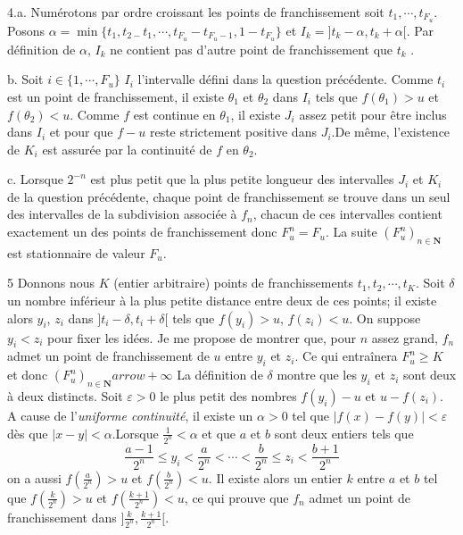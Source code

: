 4.a.  Num{\'e}rotons par ordre croissant les points de franchissement soit $%
t_{1},\cdots ,t_{F_{u}}$. Posons $\alpha =\min \{
t_{1},t_{2-}t_{1},\cdots ,t_{F_{u}}-t_{F_{u}-1},1-t_{F_{u}}\} $ et $%
I_{k}=] t_{k}-\alpha ,t_{k}+\alpha [ $. Par d{\'e}finition de $%
\alpha $, $I_{k}$ ne contient pas d'autre point de franchissement que $t_{k}$%
.

b.  Soit $i\in \{ 1,\cdots ,F_{u}\} $ $I_{i}$ l'intervalle
d{\'e}fini dans la question pr{\'e}c{\'e}dente. Comme $t_{i}$ est
un point de franchissement, il existe $\theta _{1}$ et $\theta
_{2}$ dans $I_{i}$ tels que $f(\theta _{1})>u$ et $f(\theta
_{2})<u$. Comme $f$ est continue en $\theta _{1}$, il existe
$J_{i}$ assez petit pour {\^e}tre inclus dans $I_{i} $ et pour que
$f-u$ reste strictement positive dans $J_{i}.$De m{\^e}me,
l'existence de $K_{i}$ est assur{\'e}e par la continuit{\'e} de $f$ en $%
\theta _{2}$.

c.  Lorsque $2^{-n}$ est plus petit que la plus petite longueur
des intervalles $J_{i}$ et $K_{i}$ de la question
pr{\'e}c{\'e}dente, chaque point de franchissement se trouve dans
un seul des intervalles de la subdivision associ{\'e}e {\`a}
$f_{n}$, chacun de ces intervalles contient
exactement un des points de franchissement donc $F_{u}^{n}=F_{u}$. La suite $%
(F_{u}^{n})_{n\in \mathbf{N}}$ est stationnaire de valeur $F_{u}$.

5  Donnons nous $K$ (entier arbitraire) points de franchissements $%
t_{1},t_{2},\cdots ,t_{K}$. Soit $\delta $ un nombre inf{\'e}rieur {\`a}
la
plus petite distance entre deux de ces points; il existe alors $y_{i}$, $%
z_{i}$ dans $] t_{i}-\delta ,t_{i}+\delta [ $ tels que $f(y_{i})>u
$, $f(z_{i})<u$. On suppose $y_{i}<z_{i}$ pour fixer les
id{\'e}es. Je me propose de montrer que, pour $n$ assez grand,
$f_{n}$ admet un point de
franchissement de $u$ entre $y_{i}$ et $z_{i}$. Ce qui entra\^{i}nera $%
F_{u}^{n}\geq K$ et donc $(F_{u}^{n})_{n\in \mathbf{N}}arrow +\infty $%
\newline
La d{\'e}finition de $\delta $ montre que les $y_{i}$ et $z_{i}$ sont
deux
{\`a} deux distincts. Soit $\varepsilon >0$ le plus petit des nombres $%
f(y_{i})-u$ et $u-f(z_{i})$. A cause de l'\emph{uniforme
continuit{\'e}}, il existe un $\alpha >0$ tel que $| f(x)-f(y)|
<\varepsilon $ d{\`e}s que $| x-y| <\alpha $.\newline Lorsque
$\frac{1}{2^{n}}<\alpha $ et que $a$ et $b$ sont deux entiers tels
que
\[
\frac{a-1}{2^{n}}\leq y_{i}<\frac{a}{2^{n}}<\cdots
<\frac{b}{2^{n}}\leq z_{i}<\frac{b+1}{2^{n}}
\]
on a aussi $f(\frac{a}{2^{n}})>u$ et $f(\frac{b}{2^{n}})<u$. Il
existe alors
un entier $k$ entre $a$ et $b$ tel que $f(\frac{k}{2^{n}})>u$ et $f(\frac{k+1%
}{2^{n}})<u$, ce qui prouve que $f_{n}$ admet un point de
franchissement dans $] \frac{k}{2^{n}},\frac{k+1}{2^{n}}[ $.

